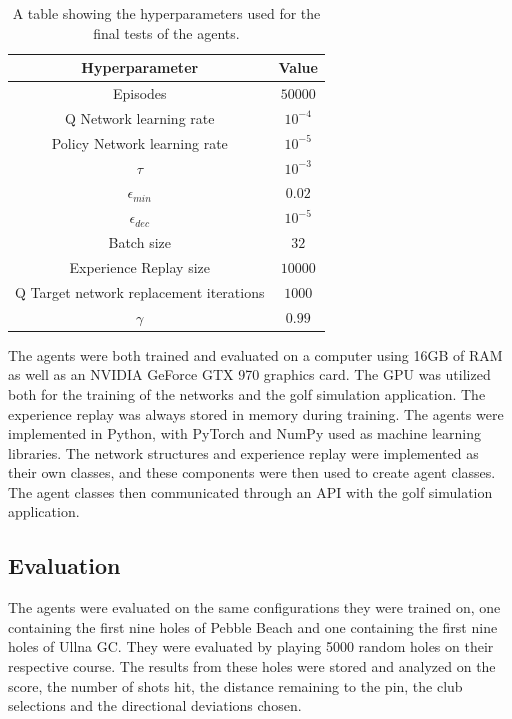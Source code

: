 \documentclass{kththesis}
\begin{document}
\begin{table}
    \centering
    \begin{tabular}{c|c}
        \textbf{Hyperparameter} & \textbf{Value} \\ \hline
        Episodes & $50000$ \\ 
        Q Network learning rate & $10^{-4}$ \\ 
        Policy Network learning rate & $10^{-5}$ \\ 
        $\tau$ & $10^{-3}$ \\ 
        $\epsilon_{min}$ & $0.02$ \\ 
        $\epsilon_{dec}$ & $10^{-5}$ \\ 
        Batch size & $32$ \\ 
        Experience Replay size & $10000$ \\ 
        Q Target network replacement iterations & $1000$ \\ 
        $\gamma$ & $0.99$ \\
    \end{tabular}
    \caption{A table showing the hyperparameters used for the final tests of the agents.}
    \label{tab:hyperparameters}
\end{table}

The agents were both trained and evaluated on a computer using 16GB of RAM as well as an NVIDIA GeForce GTX 970 graphics card. The GPU was utilized both for the training of the networks and the golf simulation application. The experience replay was always stored in memory during training. The agents were implemented in Python, with PyTorch and NumPy used as machine learning libraries. The network structures and experience replay were implemented as their own classes, and these components were then used to create agent classes. The agent classes then communicated through an API with the golf simulation application.

\subsection{Evaluation}
The agents were evaluated on the same configurations they were trained on, one containing the first nine holes of Pebble Beach and one containing the first nine holes of Ullna GC. They were evaluated by playing 5000 random holes on their respective course. The results from these holes were stored and analyzed on the score, the number of shots hit, the distance remaining to the pin, the club selections and the directional deviations chosen.
\end{document}
